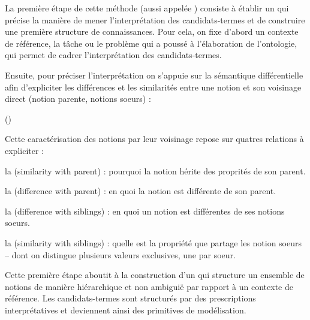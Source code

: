 \g{[1.]} La première étape de cette méthode (aussi appelée ) consiste à établir un   qui précise la manière de mener l'interprétation des candidats-termes et de construire une première structure de connaissances. 
Pour cela, on fixe d'abord un contexte de référence, la tâche ou le problème qui a poussé à l'élaboration de l'ontologie, qui permet de cadrer l'interprétation des candidats-termes.

Ensuite, pour préciser l'interprétation on s'appuie sur la sémantique différentielle afin d'expliciter les différences et les similarités entre une notion et son voisinage direct (notion parente, notions soeurs) : 

	 (\cite[p.139]{bachimont:icc})

Cette caractérisation des notions par leur voisinage repose sur quatres relations à expliciter : 
\begin{liste}
	\item la  (similarity with parent) : pourquoi la notion hérite des proprités de son parent.
	\item la  (difference with parent) : en quoi la notion est différente de son parent.
	\item la  (difference with siblings) : en quoi un notion est différentes de ses notions soeurs.
	\item la  (similarity with siblings) : quelle est la propriété que partage les notion soeurs -- dont on distingue plusieurs valeurs exclusives, une par soeur.\\ 		
\end{liste}

Cette première étape aboutit à la construction d'un  qui structure un ensemble de notions de manière hiérarchique et non ambiguië par rapport à un contexte de référence.
Les candidats-termes sont structurés par des prescriptions interprétatives et deviennent ainsi des primitives de modélisation.\\

